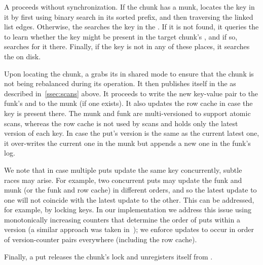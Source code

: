 A 
 proceeds without synchronization. If the chunk has a munk,     locates the key in it by first using binary search in its sorted prefix, and then traversing the linked list edges. 
Otherwise, the  searches the key in the . If it is not found, it queries 
the  to learn whether the key might be present in the target chunk's  
 , and if so, searches for it there.  Finally, if the key is not in any of these places, it searches
 the     on disk.


Upon locating the chunk,  a  grabs its  in shared mode to ensure that the chunk is not being rebalanced during its operation. It then  publishes itself 
in the  as described in~\cref{ssec:scans} above.
It proceeds to write the new key-value pair to the  funk's  and to the 
munk (if one exists). 
It also updates the row cache in case the key is present there. 
The munk and funk are multi-versioned to support atomic scans, 
whereas the row cache is not used by scans and holds only the latest version of each key. 
In case the put's version is the same as the current latest one, it over-writes the current one in the munk
but appends a new one in the funk's log. 

We note that in case multiple puts update the same key concurrently, subtle races may arise. 
For example, two concurrent puts may update the funk and munk (or the funk and row cache) in  different orders,
and so the latest update to one will not coincide with the latest update to the other. 
This can be addressed, for example, by locking
keys. In our implementation we address this issue using monotonically increasing counters that determine 
the order of puts within a version (a similar approach was taken in~\cite{kiwi});  we  enforce 
updates to occur in order of version-counter pairs  everywhere (including the row cache).  

Finally, a put releases the chunk's lock and unregisters itself from .




